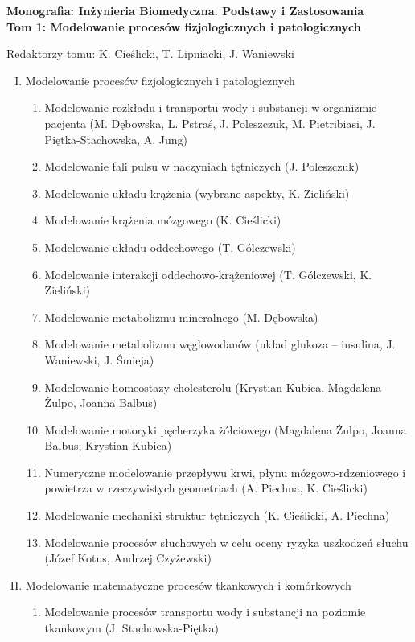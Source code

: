 \documentclass[10pt,a4paper]{article}
\begin{document}
\thispagestyle{empty}

\noindent \textbf{Monografia: Inżynieria Biomedyczna. Podstawy i Zastosowania\\Tom 1: Modelowanie procesów fizjologicznych i patologicznych}

\noindent Redaktorzy tomu: K. Cieślicki, T. Lipniacki, J. Waniewski


	\begin{enumerate}[I.]
		\item Modelowanie procesów fizjologicznych i patologicznych
		\begin{enumerate}[1.]
			\item Modelowanie rozkładu i transportu wody i substancji w organizmie pacjenta (M. Dębowska, L. Pstraś, J. Poleszczuk, M. Pietribiasi, J. Piętka-Stachowska, A. Jung)
			\item Modelowanie fali pulsu w naczyniach tętniczych (J. Poleszczuk)
			\item Modelowanie układu krążenia (wybrane aspekty, K. Zieliński) 
			\item Modelowanie krążenia mózgowego (K. Cieślicki)
			\item Modelowanie układu oddechowego (T. Gólczewski)
			\item Modelowanie interakcji oddechowo-krążeniowej (T. Gólczewski, K. Zieliński)
			\item Modelowanie metabolizmu mineralnego (M. Dębowska)
			\item Modelowanie metabolizmu węglowodanów (układ glukoza – insulina, J. Waniewski, J. Śmieja)
			\item Modelowanie homeostazy cholesterolu (Krystian Kubica, Magdalena Żulpo, Joanna Balbus)
			\item Modelowanie motoryki pęcherzyka żółciowego (Magdalena Żulpo, Joanna Balbus, Krystian Kubica)
			\item Numeryczne modelowanie przepływu krwi, płynu mózgowo-rdzeniowego i powietrza w rzeczywistych geometriach (A. Piechna, K. Cieślicki)
			\item Modelowanie mechaniki struktur tętniczych (K. Cieślicki, A. Piechna)
			\item Modelowanie procesów słuchowych w celu oceny ryzyka uszkodzeń słuchu  (Józef Kotus, Andrzej Czyżewski)
		\end{enumerate}
		\item Modelowanie matematyczne procesów tkankowych i komórkowych 
		\begin{enumerate}[1.]
			\item Modelowanie procesów transportu wody i substancji na poziomie tkankowym (J. Stachowska-Piętka)

\end{enumerate}
\end{enumerate}
\end{document}
